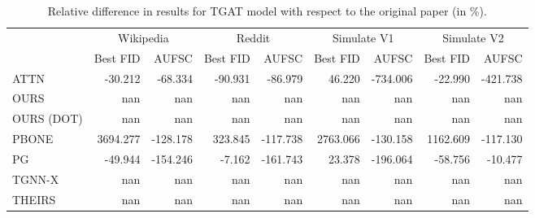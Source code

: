 \begin{table}
\centering
\begin{tabular}{lrrrrrrrr}
\toprule
 & \multicolumn{2}{c}{Wikipedia} & \multicolumn{2}{c}{Reddit} & \multicolumn{2}{c}{Simulate V1} & \multicolumn{2}{c}{Simulate V2} \\
 & Best FID & AUFSC & Best FID & AUFSC & Best FID & AUFSC & Best FID & AUFSC \\
\midrule
ATTN & -30.212 & -68.334 & -90.931 & -86.979 & 46.220 & -734.006 & -22.990 & -421.738 \\
OURS & nan & nan & nan & nan & nan & nan & nan & nan \\
OURS (DOT) & nan & nan & nan & nan & nan & nan & nan & nan \\
PBONE & 3694.277 & -128.178 & 323.845 & -117.738 & 2763.066 & -130.158 & 1162.609 & -117.130 \\
PG & -49.944 & -154.246 & -7.162 & -161.743 & 23.378 & -196.064 & -58.756 & -10.477 \\
TGNN-X & nan & nan & nan & nan & nan & nan & nan & nan \\
THEIRS & nan & nan & nan & nan & nan & nan & nan & nan \\
\bottomrule
\end{tabular}
\caption{\label{tab:tgat_results_diff}Relative difference in results for TGAT model with respect to the original paper (in \%).}
\end{table}
